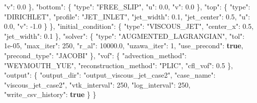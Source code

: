 \documentclass[
  10pt,
]{article}
\newenvironment{Shaded}{}{}
\newcommand{\DataTypeTok}[1]{\textcolor[rgb]{0.56,0.13,0.00}{#1}}
\newcommand{\DecValTok}[1]{\textcolor[rgb]{0.25,0.63,0.44}{#1}}
\newcommand{\FloatTok}[1]{\textcolor[rgb]{0.25,0.63,0.44}{#1}}
\newcommand{\FunctionTok}[1]{\textcolor[rgb]{0.02,0.16,0.49}{#1}}
\newcommand{\KeywordTok}[1]{\textcolor[rgb]{0.00,0.44,0.13}{\textbf{#1}}}
\newcommand{\StringTok}[1]{\textcolor[rgb]{0.25,0.44,0.63}{#1}}
\begin{document}
\begin{Shaded}
\begin{Highlighting}[]
      \DataTypeTok{"v"}\FunctionTok{:} \FloatTok{0.0}
    \FunctionTok{\},}
    \DataTypeTok{"bottom"}\FunctionTok{:} \FunctionTok{\{}
      \DataTypeTok{"type"}\FunctionTok{:} \StringTok{"FREE\_SLIP"}\FunctionTok{,}
      \DataTypeTok{"u"}\FunctionTok{:} \FloatTok{0.0}\FunctionTok{,}
      \DataTypeTok{"v"}\FunctionTok{:} \FloatTok{0.0}
    \FunctionTok{\},}
    \DataTypeTok{"top"}\FunctionTok{:} \FunctionTok{\{}
      \DataTypeTok{"type"}\FunctionTok{:} \StringTok{"DIRICHLET"}\FunctionTok{,}
      \DataTypeTok{"profile"}\FunctionTok{:} \StringTok{"JET\_INLET"}\FunctionTok{,}
      \DataTypeTok{"jet\_width"}\FunctionTok{:} \FloatTok{0.1}\FunctionTok{,}
      \DataTypeTok{"jet\_center"}\FunctionTok{:} \FloatTok{0.5}\FunctionTok{,}
      \DataTypeTok{"u"}\FunctionTok{:} \FloatTok{0.0}\FunctionTok{,}
      \DataTypeTok{"v"}\FunctionTok{:} \FloatTok{{-}1.0}
    \FunctionTok{\}}
  \FunctionTok{\},}
  \DataTypeTok{"initial\_condition"}\FunctionTok{:} \FunctionTok{\{}
    \DataTypeTok{"type"}\FunctionTok{:} \StringTok{"VISCOUS\_JET"}\FunctionTok{,}
    \DataTypeTok{"center\_x"}\FunctionTok{:} \FloatTok{0.5}\FunctionTok{,}
    \DataTypeTok{"jet\_width"}\FunctionTok{:} \FloatTok{0.1}
  \FunctionTok{\},}
  \DataTypeTok{"solver"}\FunctionTok{:} \FunctionTok{\{}
    \DataTypeTok{"type"}\FunctionTok{:} \StringTok{"AUGMENTED\_LAGRANGIAN"}\FunctionTok{,}
    \DataTypeTok{"tol"}\FunctionTok{:} \DecValTok{1e{-}05}\FunctionTok{,}
    \DataTypeTok{"max\_iter"}\FunctionTok{:} \DecValTok{250}\FunctionTok{,}
    \DataTypeTok{"r\_al"}\FunctionTok{:} \FloatTok{10000.0}\FunctionTok{,}
    \DataTypeTok{"uzawa\_iter"}\FunctionTok{:} \DecValTok{1}\FunctionTok{,}
    \DataTypeTok{"use\_precond"}\FunctionTok{:} \KeywordTok{true}\FunctionTok{,}
    \DataTypeTok{"precond\_type"}\FunctionTok{:} \StringTok{"JACOBI"}
  \FunctionTok{\},}
  \DataTypeTok{"vof"}\FunctionTok{:} \FunctionTok{\{}
    \DataTypeTok{"advection\_method"}\FunctionTok{:} \StringTok{"WEYMOUTH\_YUE"}\FunctionTok{,}
    \DataTypeTok{"reconstruction\_method"}\FunctionTok{:} \StringTok{"PLIC"}\FunctionTok{,}
    \DataTypeTok{"cfl\_vof"}\FunctionTok{:} \FloatTok{0.5}
  \FunctionTok{\},}
  \DataTypeTok{"output"}\FunctionTok{:} \FunctionTok{\{}
    \DataTypeTok{"output\_dir"}\FunctionTok{:} \StringTok{"output\_viscous\_jet\_case2"}\FunctionTok{,}
    \DataTypeTok{"case\_name"}\FunctionTok{:} \StringTok{"viscous\_jet\_case2"}\FunctionTok{,}
    \DataTypeTok{"vtk\_interval"}\FunctionTok{:} \DecValTok{250}\FunctionTok{,}
    \DataTypeTok{"log\_interval"}\FunctionTok{:} \DecValTok{250}\FunctionTok{,}
    \DataTypeTok{"write\_csv\_history"}\FunctionTok{:} \KeywordTok{true}
  \FunctionTok{\}}
\FunctionTok{\}}
\end{Highlighting}
\end{Shaded}
\end{document}

